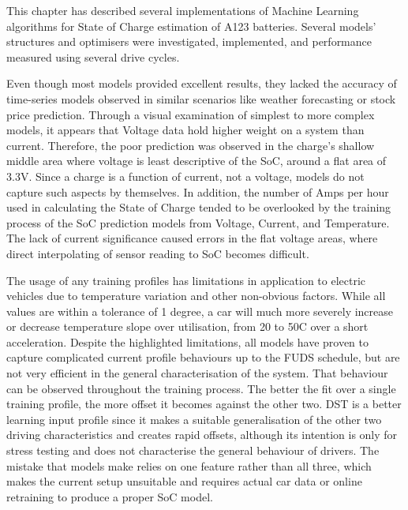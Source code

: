 This chapter has described several implementations of Machine Learning algorithms for State of Charge estimation of A123 batteries.
Several models' structures and optimisers were investigated, implemented, and performance measured using several drive cycles.

%
%
Even though most models provided excellent results, they lacked the accuracy of time-series models observed in similar scenarios like weather forecasting or stock price prediction.
Through a visual examination of simplest to more complex models, it appears that Voltage data hold higher weight on a system than current.
Therefore, the poor prediction was observed in the charge's shallow middle area where voltage is least descriptive of the SoC, around a flat area of 3.3V.
Since a charge is a function of current, not a voltage, models do not capture such aspects by themselves.
In addition, the number of Amps per hour used in calculating the State of Charge tended to be overlooked by the training process of the SoC prediction models from Voltage, Current, and Temperature.
The lack of current significance caused errors in the flat voltage areas, where direct interpolating of sensor reading to SoC becomes difficult. 

%
%
The usage of any training profiles has limitations in application to electric vehicles due to temperature variation and other non-obvious factors.
While all values are within a tolerance of 1 degree, a car will much more severely increase or decrease temperature slope over utilisation, from 20 to 50\textdegree{}C over a short acceleration.
Despite the highlighted limitations, all models have proven to capture complicated current profile behaviours up to the FUDS schedule, but are not very efficient in the general characterisation of the system.
That behaviour can be observed throughout the training process.
The better the fit over a single training profile, the more offset it becomes against the other two.
DST is a better learning input profile since it makes a suitable generalisation of the other two driving characteristics and creates rapid offsets, although its intention is only for stress testing and does not characterise the general behaviour of drivers.
The mistake that models make relies on one feature rather than all three, which makes the current setup unsuitable and requires actual car data or online retraining to produce a proper SoC model.

